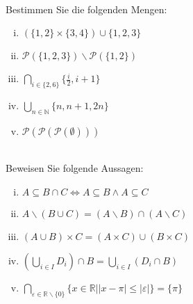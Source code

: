\newcommand{\printpraesenzlsg}{false}
\newcommand{\printloesungen}{false}
\newcommand{\printbewertungen}{false}
\newcommand{\blattnummer}{2}



\iforiginal{}

	

 \\
Bestimmen Sie die folgenden Mengen:
\begin{enumerate}[(i)]
  \item $(\{1,2\}\times\{3,4\})\cup\{1,2,3\}$
  \item $\mathscr{P}(\{1,2,3\})\backslash\mathscr{P}(\{1,2\})$
  \item $\bigcap_{i\in\{2,6\}}\{\frac{i}{2},i+1\}$ 
  \item $\bigcup_{n\in\mathbb{N}}\{n,n+1,2n\}$
  \item $\mathscr{P}(\mathscr{P}(\mathscr{P}(\emptyset)))$
\end{enumerate}


 \\
Beweisen Sie folgende Aussagen:
\begin{enumerate}[(i)]
  \item $A\subseteq B\cap C\Leftrightarrow A\subseteq B\wedge A\subseteq C$
  \item $A\backslash(B\cup C)=(A\backslash B)\cap (A\backslash C)$
  \item $(A\cup B)\times C=(A\times C)\cup (B\times C)$
  \item $\left(\bigcup_{i\in I}D_i\right)\cap B=\bigcup_{i\in I}(D_i\cap B)$
  \item $\bigcap_{\varepsilon\in\mathbb{R}\backslash\{0\}}\{x\in\mathbb{R}||x-\pi|\leq |\varepsilon|\}=\{\pi\}$
\end{enumerate}

